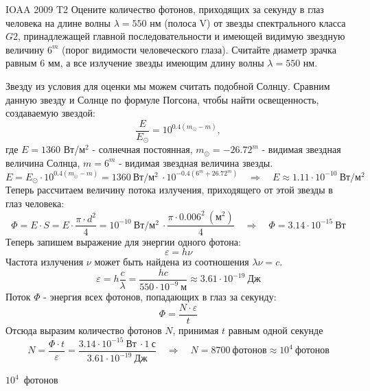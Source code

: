 \begin{problem}{IOAA 2009 T2}
	Оцените количество фотонов, приходящих за секунду в глаз человека на длине волны $\lambda=550$ нм (полоса V) от звезды спектрального класса $G2$, принадлежащей главной последовательности и имеющей видимую звездную величину $6^m$ (порог видимости человеческого глаза). Считайте диаметр зрачка равным $6$ мм, а все излучение звезды имеющим длину волны  $\lambda=550$ нм.

\begin{solution}
    Звезду из условия для оценки мы можем считать подобной Солнцу. Сравним данную звезду и Солнце по формуле Погсона, чтобы найти освещенность, создаваемую звездой:
    \begin{equation}
        \frac{E}{E_{\odot}}=10^{0.4(m_{\odot}-m)},
    \end{equation}
    где $E=1360$ Вт/м$^2$ - солнечная постоянная, $m_{\odot}=-26.72^m$ - видимая звездная величина Солнца, $m=6^m$ - видимая звездная величина звезды.
    \begin{equation}
        E=E_{\odot}\cdot 10^{0.4(m_{\odot}-m)}=1360~\text{Вт/м$^2$}~\cdot 10 ^{-0.4(6^m+26.72^m)} \quad\Longrightarrow\quad E\approx 1.11\cdot 10^{-10}~\text{Вт/м$^2$}
    \end{equation}
    Теперь рассчитаем величину потока излучения, приходящего от этой звезды в глаз человека:
    \begin{equation}
        \Phi=E\cdot S=E\cdot\frac{\pi\cdot d^2}{4}=10^{-10}~\text{Вт/м$^2$}~\cdot\frac{\pi\cdot 0.006^2~(\text{м$^2$})}{4} \quad\Longrightarrow\quad \Phi=3.14\cdot 10^{-15}~\text{Вт}
    \end{equation}
	Теперь запишем выражение для энергии одного фотона:
    \begin{equation}
        \varepsilon=h\nu
    \end{equation}
    Частота излучения $\nu$ может быть найдена из соотношения $\lambda\nu=c$.
    \begin{equation}
        \varepsilon=h\frac{c}{\lambda}=\frac{hc}{550\cdot 10^{-9}~\text{м}}\approx 3.61\cdot 10^{-19}~\text{Дж}
    \end{equation}
    Поток $\Phi$ - энергия всех фотонов, попадающих в глаз за секунду:
    \begin{equation}
        \Phi=\frac{N\cdot\varepsilon}{t}
    \end{equation}
    Отсюда выразим количество фотонов $N$, принимая $t$ равным одной секунде
    \begin{equation}
        N=\frac{\Phi\cdot t}{\varepsilon}=\frac{3.14\cdot 10^{-15}~\text{Вт}~\cdot 1~\text{с}}{3.61\cdot 10^{-19}~\text{Дж}} \quad\Longrightarrow\quad N=8700~\text{фотонов}\approx 10^4~\text{фотонов}
    \end{equation}
\end{solution}

\begin{answer}
	$10^4$~фотонов
\end{answer}
\end{problem}